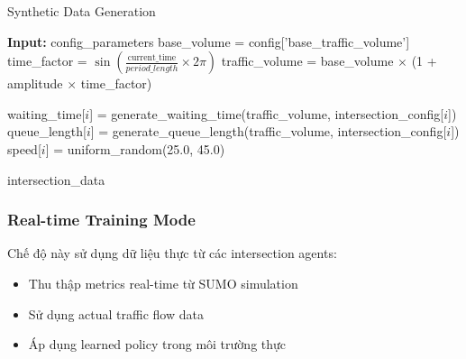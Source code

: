 
\begin{algorithm}[!htp]
    \caption{Synthetic Data Generation}
    \begin{algorithmic}
        \State \textbf{Input:} config\_parameters
        \State base\_volume = config['base\_traffic\_volume'] 
        \State time\_factor = $\sin(\frac{\text{current\_time}}{period\_length} \times 2\pi)$
        \State traffic\_volume = base\_volume $\times$ (1 + amplitude $\times$ time\_factor) 
        
            \State waiting\_time[$i$] = generate\_waiting\_time(traffic\_volume, intersection\_config[$i$])
            \State queue\_length[$i$] = generate\_queue\_length(traffic\_volume, intersection\_config[$i$])
            \State speed[$i$] = uniform\_random(25.0, 45.0) 
        \EndFor 
        
        \Return intersection\_data
    \end{algorithmic}
\end{algorithm}

\subsubsection{Real-time Training Mode}
Chế độ này sử dụng dữ liệu thực từ các intersection agents:
\begin{itemize}
    \item Thu thập metrics real-time từ SUMO simulation

    \item Sử dụng actual traffic flow data

    \item Áp dụng learned policy trong môi trường thực
\end{itemize}

